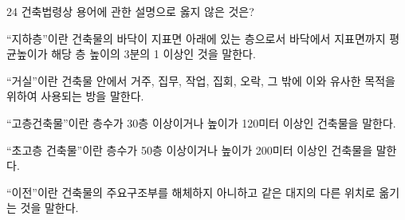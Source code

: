 \begin{question}{24}
건축법령상 용어에 관한 설명으로 옳지 않은 것은?
\begin{choices}
  \item “지하층”이란 건축물의 바닥이 지표면 아래에 있는 층으로서 바닥에서 지표면까지 평균높이가 해당 층 높이의 3분의 1 이상인 것을 말한다.
  \item “거실”이란 건축물 안에서 거주, 집무, 작업, 집회, 오락, 그 밖에 이와 유사한 목적을 위하여 사용되는 방을 말한다.
  \item “고층건축물”이란 층수가 30층 이상이거나 높이가 120미터 이상인 건축물을 말한다.
  \item “초고층 건축물”이란 층수가 50층 이상이거나 높이가 200미터 이상인 건축물을 말한다.
  \item “이전”이란 건축물의 주요구조부를 해체하지 아니하고 같은 대지의 다른 위치로 옮기는 것을 말한다.
\end{choices}
\end{question}
